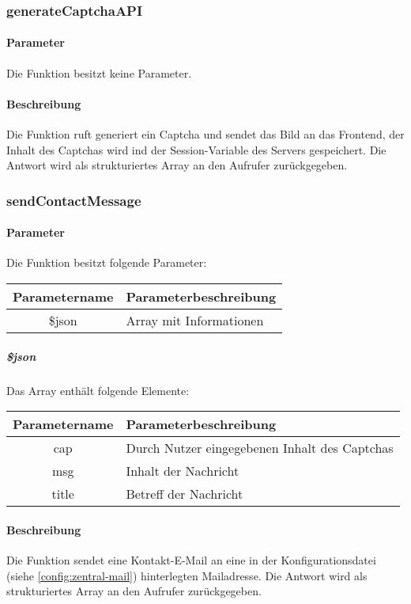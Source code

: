 \subsubsection{generateCaptchaAPI}
\paragraph{Parameter} Die Funktion besitzt keine Parameter.
\paragraph{Beschreibung} Die Funktion ruft generiert ein Captcha und sendet das Bild an das Frontend, der Inhalt des Captchas wird ind der Session-Variable des Servers gespeichert. Die Antwort wird als strukturiertes Array an den Aufrufer zurückgegeben.
\subsubsection{sendContactMessage}
\paragraph{Parameter} Die Funktion besitzt folgende Parameter:
\begin{table}[H]
	\begin{tabular}{|c|p{11cm}|}
		\hline
		\textbf{Parametername} & \textbf{Parameterbeschreibung} \\ \hline
		\$json & Array mit Informationen \\ \hline
	\end{tabular}
\end{table}
\subparagraph{\$json}Das Array enthält folgende Elemente:
\begin{table}[H]
	\begin{tabular}{|c|p{11cm}|}
		\hline
		\textbf{Parametername} & \textbf{Parameterbeschreibung} \\ \hline
		cap   & Durch Nutzer eingegebenen Inhalt des Captchas \\ \hline
		msg   & Inhalt der Nachricht \\ \hline
		title & Betreff der Nachricht  \\ \hline
	\end{tabular}
\end{table}
\paragraph{Beschreibung} Die Funktion sendet eine Kontakt-E-Mail an eine in der Konfigurationsdatei (siehe \autoref{config:zentral-mail}) hinterlegten Mailadresse. Die Antwort wird als strukturiertes Array an den Aufrufer zurückgegeben.

